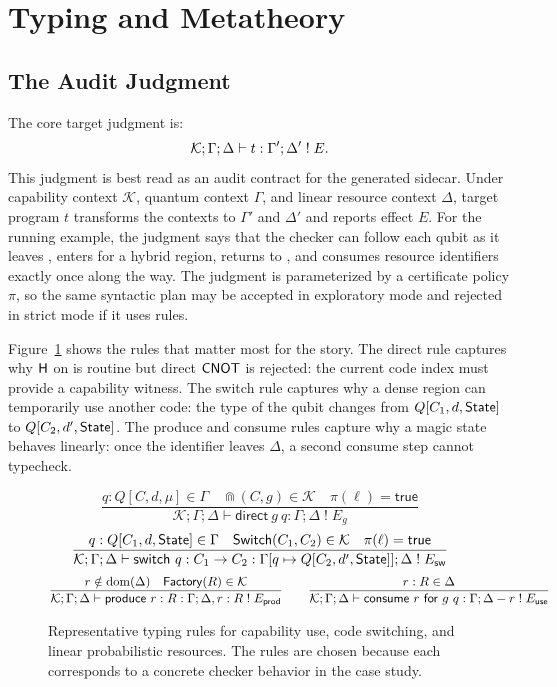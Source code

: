 \section{Typing and Metatheory}

\subsection{The Audit Judgment}

The core target judgment is:
\[
  \mathcal{K};\Gamma;\Delta \vdash t : \Gamma';\Delta' \;!\; E.
\]
This judgment is best read as an audit contract for the generated sidecar.
Under capability context $\mathcal{K}$, quantum context $\Gamma$, and linear resource context $\Delta$, target program $t$ transforms the contexts to $\Gamma'$ and $\Delta'$ and reports effect $E$.
For the running example, the judgment says that the checker can follow each qubit as it leaves , enters  for a hybrid region, returns to , and consumes resource identifiers exactly once along the way.
The judgment is parameterized by a certificate policy $\pi$, so the same syntactic plan may be accepted in exploratory mode and rejected in strict mode if it uses \Assumed{} rules.

Figure~\ref{fig:typing} shows the rules that matter most for the story.
The direct rule captures why $\mathsf{H}$ on  is routine but direct $\mathsf{CNOT}$ is rejected: the current code index must provide a capability witness.
The switch rule captures why a dense region can temporarily use another code: the type of the qubit changes from $Q[C_1,d,\mathsf{State}]$ to $Q[C_2,d',\mathsf{State}]$.
The produce and consume rules capture why a magic state behaves linearly: once the identifier leaves $\Delta$, a second consume step cannot typecheck.

\begin{figure}[t]
\[
\frac{
  q:Q[C,d,\mu]\in\Gamma \quad \Cap(C,g)\in\mathcal{K} \quad \pi(\ell)=\mathsf{true}
}{
  \mathcal{K};\Gamma;\Delta \vdash \mathsf{direct}\ g\ q : \Gamma;\Delta \;!\; E_g
}
\]
\[
\frac{
  q:Q[C_1,d,\mathsf{State}]\in\Gamma \quad \mathsf{Switch}(C_1,C_2)\in\mathcal{K} \quad \pi(\ell)=\mathsf{true}
}{
  \mathcal{K};\Gamma;\Delta \vdash \mathsf{switch}\ q:C_1\to C_2 :
  \Gamma[q\mapsto Q[C_2,d',\mathsf{State}]];\Delta \;!\; E_{\mathsf{sw}}
}
\]
\[
\frac{
  r\notin\mathrm{dom}(\Delta) \quad \Factory(R)\in\mathcal{K}
}{
  \mathcal{K};\Gamma;\Delta \vdash \mathsf{produce}\ r:R :
  \Gamma;\Delta,r:R \;!\; E_{\mathsf{prod}}
}
\qquad
\frac{
  r:R\in\Delta
}{
  \mathcal{K};\Gamma;\Delta \vdash \mathsf{consume}\ r\ \mathsf{for}\ g\ q :
  \Gamma;\Delta-r \;!\; E_{\mathsf{use}}
}
\]
\caption{Representative typing rules for capability use, code switching, and linear probabilistic resources. The rules are chosen because each corresponds to a concrete checker behavior in the case study.}
\label{fig:typing}
\end{figure}

